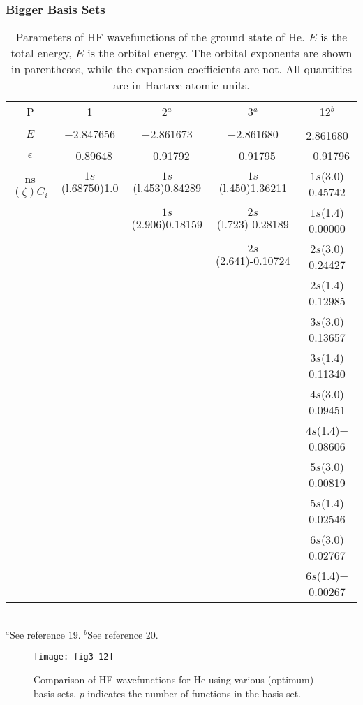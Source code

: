 \subsubsection{Bigger Basis Sets}

\begin{table}
\caption{Parameters of HF wavefunctions of the 
ground state of He. $E$ is the total energy, $E$ is the orbital
energy. The orbital exponents are shown in parentheses, while the
expansion coefficients are not. All quantities are in Hartree atomic
units.}

\begin{tabular}{ccccc} \\ \hline
P & 1 & 2$^a$ & 3$^a$ & 12$^b$\\
$E$ &$-$2.847656 & $-$2.861673 & $-$2.861680 & $-$2.861680\\
$\epsilon$ & $-$0.89648 & $-$0.91792 & $-$0.91795 & $-$0.91796\\ \hline
ns$(\zeta)C_i$&$1s$(l.68750)1.0&$1s$(l.453)0.84289&$1s$(l.450)1.36211
&$1s$(3.0) 0.45742\\
&&$1s$(2.906)0.18159&$2s$(l.723)-0.28189&$1s$(1.4) 0.00000\\
&&&$2s$(2.641)-0.10724&$2s$(3.0) 0.24427\\
&&&&$2s$(1.4) 0.12985\\
&&&&$3s$(3.0) 0.13657\\
&&&&$3s$(1.4) 0.11340\\
&&&&$4s$(3.0) 0.09451\\
&&&&$4s$(1.4)$-$0.08606\\
&&&&$5s$(3.0) 0.00819\\
&&&&$5s$(1.4) 0.02546\\
&&&&$6s$(3.0) 0.02767\\
&&&&$6s$(1.4)$-$0.00267\\ \hline 
\end{tabular}\\
$^a$See reference 19.  $^b$See reference 20.
\end{table}

\begin{figure}
\texttt{[image: fig3-12]}
\caption{Comparison of HF wavefunctions for He using various (optimum)
basis sets.  $p$ indicates the number of functions in the basis set.}
\label{fig3-13}
\end{figure}

